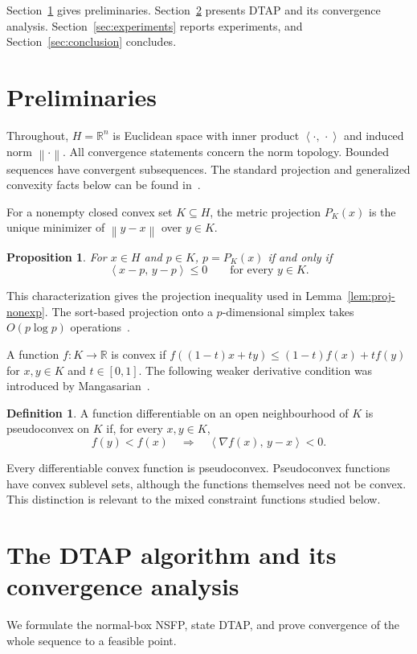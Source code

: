 \documentclass[]{interact}
\theoremstyle{plain}
\newtheorem{proposition}[theorem]{Proposition}
\theoremstyle{definition}
\newtheorem{definition}[theorem]{Definition}
\theoremstyle{remark}
\newcommand{\R}{\mathbb{R}}
\newcommand{\norm}[1]{\left\lVert #1 \right\rVert}
\newcommand{\inner}[2]{\left\langle #1,\, #2 \right\rangle}
\newcommand{\dtap}{\textsc{DTAP}}
\begin{document}
Section~\ref{sec:prelim} gives preliminaries. Section~\ref{sec:convergence} presents \dtap{} and its convergence analysis. Section~\ref{sec:experiments} reports experiments, and Section~\ref{sec:conclusion} concludes.


\section{Preliminaries}\label{sec:prelim}
Throughout, $H=\R^n$ is Euclidean space with inner product $\inner{\cdot}{\cdot}$ and induced norm $\norm{\cdot}$. All convergence statements concern the norm topology. Bounded sequences have convergent subsequences. The standard projection and generalized convexity facts below can be found in~\citep{bauschke2011,mangasarian1994}.

For a nonempty closed convex set $K\subseteq H$, the metric projection $P_K(x)$ is the unique minimizer of $\norm{y-x}$ over $y\in K$.
\begin{proposition}\label{prop:proj-char}
For $x\in H$ and $p\in K$, $p=P_K(x)$ if and only if
\begin{equation}\label{eq:proj-char}
\inner{x-p}{y-p}\le0\qquad\text{for every }y\in K.
\end{equation}
\end{proposition}
This characterization gives the projection inequality used in Lemma~\ref{lem:proj-nonexp}. The sort-based projection onto a $p$-dimensional simplex takes $O(p\log p)$ operations~\citep{condat2016simplex}.

A function $f:K\to\R$ is convex if
$f((1-t)x+ty)\le(1-t)f(x)+tf(y)$ for $x,y\in K$ and $t\in[0,1]$.
The following weaker derivative condition was introduced by Mangasarian~\citep{mangasarian1965}.
\begin{definition}\label{def:pseudoconvex}
A function differentiable on an open neighbourhood of $K$ is pseudoconvex on $K$ if, for every $x,y\in K$,
\begin{equation}\label{eq:contrapositive}
f(y)<f(x)\quad\Longrightarrow\quad\inner{\nabla f(x)}{y-x}<0.
\end{equation}
\end{definition}
Every differentiable convex function is pseudoconvex. Pseudoconvex functions have convex sublevel sets, although the functions themselves need not be convex. This distinction is relevant to the mixed constraint functions studied below.

\section{The DTAP algorithm and its convergence analysis}\label{sec:convergence}
We formulate the normal-box NSFP, state DTAP, and prove convergence of the whole sequence
to a feasible point.
\end{document}
